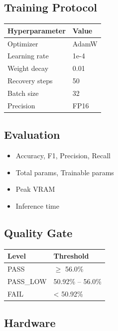 \subsection{Training Protocol}

\begin{table}[H]
\centering
\small
\begin{tabular}{ll}
\toprule
\textbf{Hyperparameter} & \textbf{Value} \\
\midrule
Optimizer & AdamW \\
Learning rate & 1e-4 \\
Weight decay & 0.01 \\
Recovery steps & 50 \\
Batch size & 32 \\
Precision & FP16 \\
\bottomrule
\end{tabular}
\end{table}

\subsection{Evaluation}

\begin{itemize}
\item Accuracy, F1, Precision, Recall
\item Total params, Trainable params
\item Peak VRAM
\item Inference time

\end{itemize}
\subsection{Quality Gate}

\begin{table}[H]
\centering
\small
\begin{tabular}{ll}
\toprule
\textbf{Level} & \textbf{Threshold} \\
\midrule
PASS & $\ge$ 56.0\% \\
PASS\_LOW & 50.92\% -- 56.0\% \\
FAIL & \textless{} 50.92\% \\
\bottomrule
\end{tabular}
\end{table}

\subsection{Hardware}


